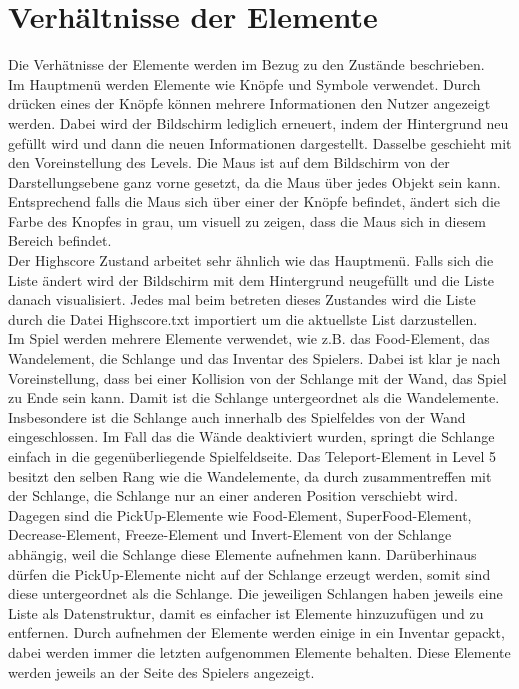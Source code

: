 \section{Verh{\"a}ltnisse der Elemente}
\label{Verhaeltnisse_der_Elemente}
%
Die Verh{\"a}tnisse der Elemente werden im Bezug zu den Zust{\"a}nde beschrieben. \\
Im Hauptmen{\"u} werden Elemente wie Kn{\"o}pfe und Symbole verwendet. Durch dr{\"u}cken eines der Kn{\"o}pfe k{\"o}nnen mehrere Informationen den Nutzer angezeigt werden. Dabei wird der Bildschirm lediglich erneuert, indem der Hintergrund neu gef{\"u}llt wird und dann die neuen Informationen dargestellt. Dasselbe geschieht mit den Voreinstellung des Levels. Die Maus ist auf dem Bildschirm von der Darstellungsebene ganz vorne gesetzt, da die Maus {\"u}ber jedes Objekt sein kann. Entsprechend falls die Maus sich {\"u}ber einer der Kn{\"o}pfe befindet, {\"a}ndert sich die Farbe des Knopfes in grau, um visuell zu zeigen, dass die Maus sich in diesem Bereich befindet. \\ 
Der Highscore Zustand arbeitet sehr {\"a}hnlich wie das Hauptmen{\"u}. Falls sich die Liste {\"a}ndert wird der Bildschirm mit dem Hintergrund neugef{\"u}llt und die Liste danach visualisiert. Jedes mal beim betreten dieses Zustandes wird die Liste durch die Datei \glqq Highscore.txt\grqq{} importiert um die aktuellste List darzustellen. \\
Im Spiel werden mehrere Elemente verwendet, wie z.B. das Food-Element, das Wandelement, die Schlange und das Inventar des Spielers. Dabei ist klar je nach Voreinstellung, dass bei einer Kollision von der Schlange mit der Wand, das Spiel zu Ende sein kann. Damit ist die Schlange untergeordnet als die Wandelemente. Insbesondere ist die Schlange auch innerhalb des Spielfeldes von der Wand eingeschlossen. Im Fall das die W{\"a}nde deaktiviert wurden, springt die Schlange einfach in die gegen{\"u}berliegende Spielfeldseite. Das Teleport-Element in Level 5 besitzt den selben Rang wie die Wandelemente, da durch zusammentreffen mit der Schlange, die Schlange nur an einer anderen Position verschiebt wird. Dagegen sind die PickUp-Elemente wie Food-Element, SuperFood-Element, Decrease-Element, Freeze-Element und Invert-Element von der Schlange abh{\"a}ngig, weil die Schlange diese Elemente aufnehmen kann. Dar{\"u}berhinaus d{\"u}rfen die PickUp-Elemente nicht auf der Schlange erzeugt werden, somit sind diese untergeordnet als die Schlange. Die jeweiligen Schlangen haben jeweils eine Liste als Datenstruktur, damit es einfacher ist Elemente hinzuzuf{\"u}gen und zu entfernen. Durch aufnehmen der Elemente werden einige in ein Inventar gepackt, dabei werden immer die letzten aufgenommen Elemente behalten. Diese Elemente werden jeweils an der Seite des Spielers angezeigt. 

 
%